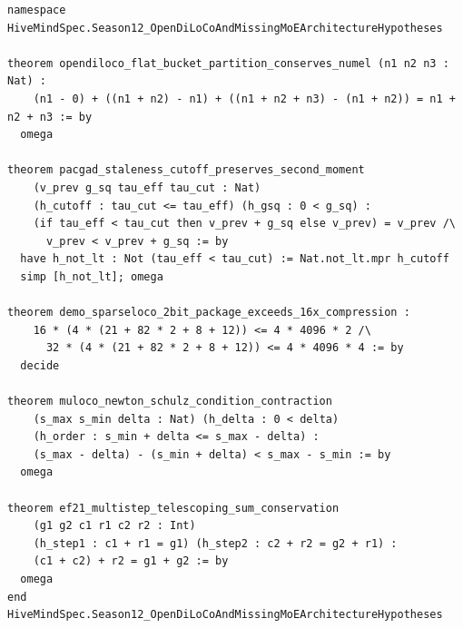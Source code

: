 \documentclass[11pt,a4paper]{article}
\begin{document}
\begin{lstlisting}[language=Lean4,caption={Excerpt from \texttt{lean4/HiveMindSpec.lean} (Season 12: OpenDiLoCo Flat-Bucket, PA-CGAD Piecewise Cutoff, DeMo-SparseLoCo 2-Bit Gate, MuLoCo Spread Contraction, and EF21 Telescoping Sum).}]
namespace HiveMindSpec.Season12_OpenDiLoCoAndMissingMoEArchitectureHypotheses

theorem opendiloco_flat_bucket_partition_conserves_numel (n1 n2 n3 : Nat) :
    (n1 - 0) + ((n1 + n2) - n1) + ((n1 + n2 + n3) - (n1 + n2)) = n1 + n2 + n3 := by
  omega

theorem pacgad_staleness_cutoff_preserves_second_moment
    (v_prev g_sq tau_eff tau_cut : Nat)
    (h_cutoff : tau_cut <= tau_eff) (h_gsq : 0 < g_sq) :
    (if tau_eff < tau_cut then v_prev + g_sq else v_prev) = v_prev /\
      v_prev < v_prev + g_sq := by
  have h_not_lt : Not (tau_eff < tau_cut) := Nat.not_lt.mpr h_cutoff
  simp [h_not_lt]; omega

theorem demo_sparseloco_2bit_package_exceeds_16x_compression :
    16 * (4 * (21 + 82 * 2 + 8 + 12)) <= 4 * 4096 * 2 /\
      32 * (4 * (21 + 82 * 2 + 8 + 12)) <= 4 * 4096 * 4 := by
  decide

theorem muloco_newton_schulz_condition_contraction
    (s_max s_min delta : Nat) (h_delta : 0 < delta)
    (h_order : s_min + delta <= s_max - delta) :
    (s_max - delta) - (s_min + delta) < s_max - s_min := by
  omega

theorem ef21_multistep_telescoping_sum_conservation
    (g1 g2 c1 r1 c2 r2 : Int)
    (h_step1 : c1 + r1 = g1) (h_step2 : c2 + r2 = g2 + r1) :
    (c1 + c2) + r2 = g1 + g2 := by
  omega
end HiveMindSpec.Season12_OpenDiLoCoAndMissingMoEArchitectureHypotheses
\end{lstlisting}
\end{document}
